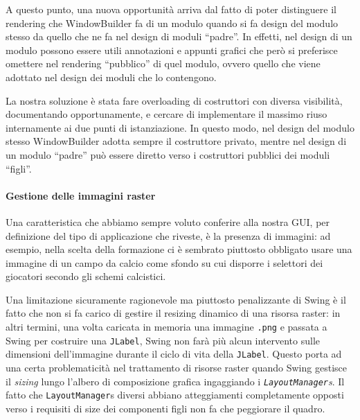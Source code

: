 A questo punto, una nuova opportunità arriva dal fatto di poter distinguere il rendering che WindowBuilder fa di un modulo quando si fa design del modulo stesso da quello che ne fa nel design di moduli ``padre''. In effetti, nel design di un modulo possono essere utili annotazioni e appunti grafici che però si preferisce omettere nel rendering ``pubblico'' di quel modulo, ovvero quello che viene adottato nel design dei moduli che lo contengono.

La nostra soluzione è stata fare overloading di costruttori con diversa visibilità, documentando opportunamente, e cercare di implementare il massimo riuso internamente ai due punti di istanziazione. In questo modo, nel design del modulo stesso WindowBuilder adotta sempre il costruttore privato, mentre nel design di un modulo ``padre'' può essere diretto verso i costruttori pubblici dei moduli ``figli''.

\paragraph{Gestione delle immagini raster}
Una caratteristica che abbiamo sempre voluto conferire alla nostra GUI, per definizione del tipo di applicazione che riveste, è la presenza di immagini: ad esempio, nella scelta della formazione ci è sembrato piuttosto obbligato usare una immagine di un campo da calcio come sfondo su cui disporre i selettori dei giocatori secondo gli schemi calcistici.

Una limitazione sicuramente ragionevole ma piuttosto penalizzante di Swing è il fatto che non si fa carico di gestire il resizing dinamico di una risorsa raster: in altri termini, una volta caricata in memoria una immagine \texttt{.png} e passata a Swing per costruire una \texttt{JLabel}, Swing non farà più alcun intervento sulle dimensioni dell'immagine durante il ciclo di vita della \texttt{JLabel}. Questo porta ad una certa problematicità nel trattamento di risorse raster quando Swing gestisce il \emph{sizing} lungo l'albero di composizione grafica ingaggiando i \emph{\texttt{LayoutManager}s}. Il fatto che \texttt{LayoutManager}s diversi abbiano atteggiamenti completamente opposti verso i requisiti di size dei componenti figli non fa che peggiorare il quadro.


